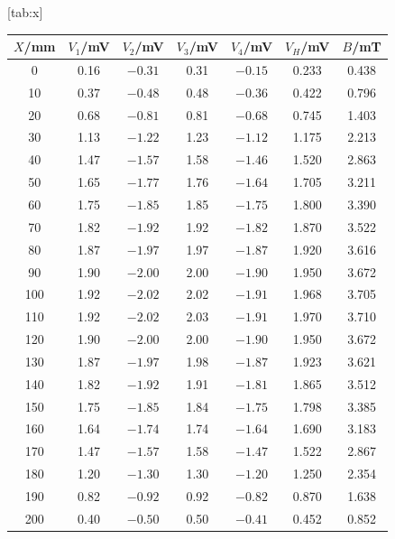 [tab:x]{
\begin{tabular}{ccccccc}
\toprule
$X$/mm & $V_1$/mV & $V_2$/mV & $V_3$/mV & $V_4$/mV & $V_H$/mV & $B$/mT \\
\midrule
0 & 0.16 & $-0.31$ & 0.31 & $-0.15$ & 0.233 & 0.438 \\
10 & 0.37 & $-0.48$ & 0.48 & $-0.36$ & 0.422 & 0.796 \\
20 & 0.68 & $-0.81$ & 0.81 & $-0.68$ & 0.745 & 1.403 \\
30 & 1.13 & $-1.22$ & 1.23 & $-1.12$ & 1.175 & 2.213 \\
40 & 1.47 & $-1.57$ & 1.58 & $-1.46$ & 1.520 & 2.863 \\
50 & 1.65 & $-1.77$ & 1.76 & $-1.64$ & 1.705 & 3.211 \\
60 & 1.75 & $-1.85$ & 1.85 & $-1.75$ & 1.800 & 3.390 \\
70 & 1.82 & $-1.92$ & 1.92 & $-1.82$ & 1.870 & 3.522 \\
80 & 1.87 & $-1.97$ & 1.97 & $-1.87$ & 1.920 & 3.616 \\
90 & 1.90 & $-2.00$ & 2.00 & $-1.90$ & 1.950 & 3.672 \\
100 & 1.92 & $-2.02$ & 2.02 & $-1.91$ & 1.968 & 3.705 \\
110 & 1.92 & $-2.02$ & 2.03 & $-1.91$ & 1.970 & 3.710 \\
120 & 1.90 & $-2.00$ & 2.00 & $-1.90$ & 1.950 & 3.672 \\
130 & 1.87 & $-1.97$ & 1.98 & $-1.87$ & 1.923 & 3.621 \\
140 & 1.82 & $-1.92$ & 1.91 & $-1.81$ & 1.865 & 3.512 \\
150 & 1.75 & $-1.85$ & 1.84 & $-1.75$ & 1.798 & 3.385 \\
160 & 1.64 & $-1.74$ & 1.74 & $-1.64$ & 1.690 & 3.183 \\
170 & 1.47 & $-1.57$ & 1.58 & $-1.47$ & 1.522 & 2.867 \\
180 & 1.20 & $-1.30$ & 1.30 & $-1.20$ & 1.250 & 2.354 \\
190 & 0.82 & $-0.92$ & 0.92 & $-0.82$ & 0.870 & 1.638 \\
200 & 0.40 & $-0.50$ & 0.50 & $-0.41$ & 0.452 & 0.852 \\
\bottomrule
\end{tabular}}
